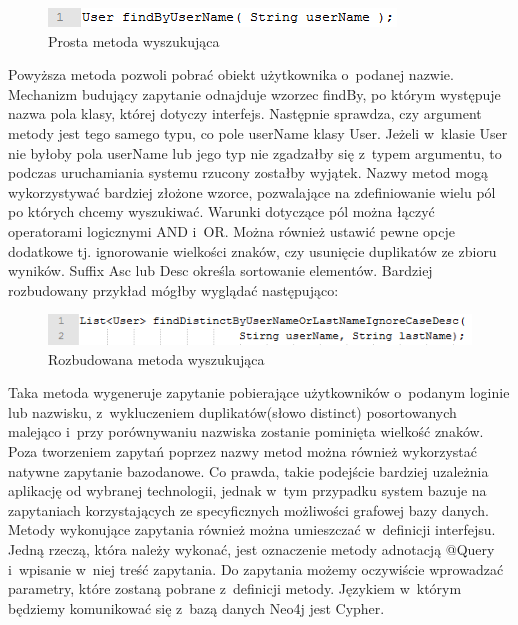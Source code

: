 \begin{figure}[H]
	\centering
	\includegraphics{images/findbyusername.png}
	\caption{Prosta metoda wyszukująca}
\end{figure}


Powyższa metoda pozwoli pobrać obiekt użytkownika o~podanej nazwie. Mechanizm budujący zapytanie odnajduje wzorzec findBy, po którym występuje nazwa pola klasy, której dotyczy interfejs. Następnie sprawdza, czy argument metody jest tego samego typu, co pole userName klasy User. Jeżeli w~klasie User nie byłoby pola userName lub jego typ nie zgadzałby się z~typem argumentu, to podczas uruchamiania systemu rzucony zostałby wyjątek. 
Nazwy metod mogą wykorzystywać bardziej złożone wzorce, pozwalające na zdefiniowanie wielu pól po których chcemy wyszukiwać. Warunki dotyczące pól można łączyć operatorami logicznymi AND i~OR.  Można również ustawić pewne opcje dodatkowe tj. ignorowanie wielkości znaków, czy usunięcie duplikatów ze zbioru wyników. Suffix Asc lub Desc określa sortowanie elementów. Bardziej rozbudowany przykład mógłby wyglądać następująco:

\begin{figure}[H]
	\centering
	\includegraphics{images/findlong.png}
	\caption{Rozbudowana metoda wyszukująca}
\end{figure}


Taka metoda wygeneruje zapytanie pobierające użytkowników o~podanym loginie lub nazwisku, z~wykluczeniem duplikatów(słowo distinct) posortowanych malejąco i~przy porównywaniu nazwiska zostanie pominięta wielkość znaków. 
Poza tworzeniem zapytań poprzez nazwy metod można również wykorzystać natywne zapytanie bazodanowe. Co prawda, takie podejście bardziej uzależnia aplikację od wybranej technologii, jednak w~tym przypadku system bazuje na zapytaniach korzystających ze specyficznych możliwości grafowej bazy danych. Metody wykonujące zapytania również można umieszczać w~definicji interfejsu. Jedną rzeczą, która należy wykonać, jest oznaczenie metody adnotacją @Query i~wpisanie w~niej treść zapytania. Do zapytania możemy oczywiście wprowadzać parametry, które zostaną pobrane z~definicji metody. Językiem w~którym będziemy komunikować się z~bazą danych Neo4j jest Cypher. 

